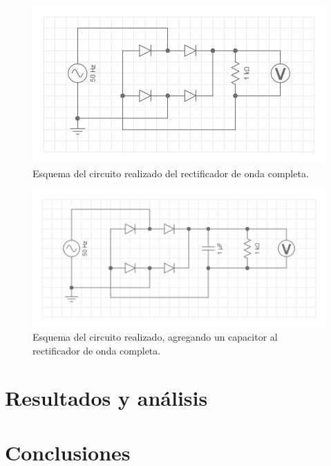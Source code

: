 \documentclass[twoside,twocolumn,a4paper]{article}
\begin{document}
\begin{figure}[h]
\includegraphics[width=\linewidth]{disp_exp2.png}
\caption{Esquema del circuito realizado del rectificador de onda completa.}
\label{fig:disp_exp2}
\end{figure}


\begin{figure}[h]
\includegraphics[width=\linewidth]{disp_exp3.png}
\caption{Esquema del circuito realizado, agregando un capacitor al rectificador de onda completa.}
\label{fig:disp_exp3}
\end{figure}

\section{Resultados y an\'alisis}


\section{Conclusiones}


\end{document}

